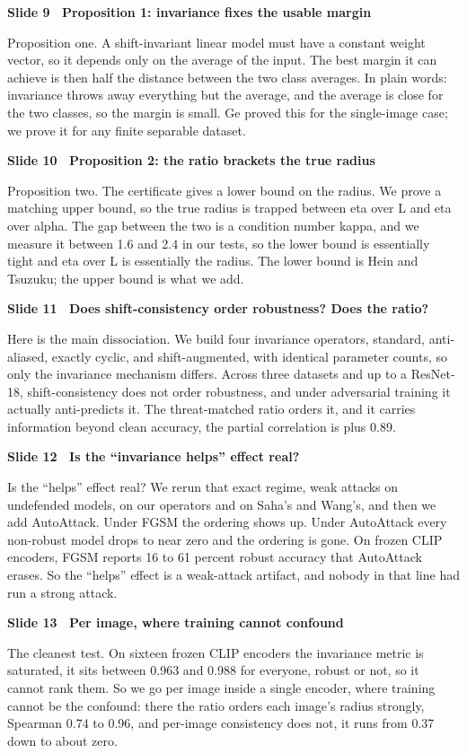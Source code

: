 \documentclass[11pt]{article}
\newcommand{\slide}[3]{%
  \par\vspace{0.9em}%
  {\color{TUMblue}\bfseries Slide #1 \textbullet\ #2}\par
  \vspace{0.25em}#3\par}
\begin{document}
\slide{9}{Proposition 1: invariance fixes the usable margin}{%
Proposition one. A shift-invariant linear model must have a constant weight vector, so it depends only
on the average of the input. The best margin it can achieve is then half the distance between the two
class averages. In plain words: invariance throws away everything but the average, and the average is
close for the two classes, so the margin is small. Ge proved this for the single-image case; we prove
it for any finite separable dataset.}

\slide{10}{Proposition 2: the ratio brackets the true radius}{%
Proposition two. The certificate gives a lower bound on the radius. We prove a matching upper bound,
so the true radius is trapped between eta over L and eta over alpha. The gap between the two is a
condition number kappa, and we measure it between 1.6 and 2.4 in our tests, so the lower bound is
essentially tight and eta over L is essentially the radius. The lower bound is Hein and Tsuzuku; the
upper bound is what we add.}

\slide{11}{Does shift-consistency order robustness? Does the ratio?}{%
Here is the main dissociation. We build four invariance operators, standard, anti-aliased, exactly
cyclic, and shift-augmented, with identical parameter counts, so only the invariance mechanism
differs. Across three datasets and up to a ResNet-18, shift-consistency does not order robustness, and
under adversarial training it actually anti-predicts it. The threat-matched ratio orders it, and it
carries information beyond clean accuracy, the partial correlation is plus 0.89.}

\slide{12}{Is the ``invariance helps'' effect real?}{%
Is the ``helps'' effect real? We rerun that exact regime, weak attacks on undefended models, on our
operators and on Saha's and Wang's, and then we add AutoAttack. Under FGSM the ordering shows up.
Under AutoAttack every non-robust model drops to near zero and the ordering is gone. On frozen CLIP
encoders, FGSM reports 16 to 61 percent robust accuracy that AutoAttack erases. So the ``helps''
effect is a weak-attack artifact, and nobody in that line had run a strong attack.}

\slide{13}{Per image, where training cannot confound}{%
The cleanest test. On sixteen frozen CLIP encoders the invariance metric is saturated, it sits between
0.963 and 0.988 for everyone, robust or not, so it cannot rank them. So we go per image inside a
single encoder, where training cannot be the confound: there the ratio orders each image's radius
strongly, Spearman 0.74 to 0.96, and per-image consistency does not, it runs from 0.37 down to about
zero.}
\end{document}
